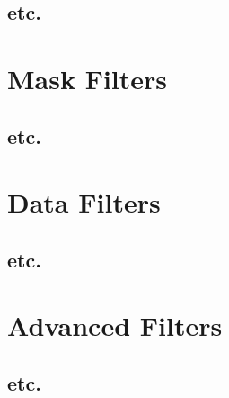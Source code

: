 \documentclass[fleqn,11pt,openany]{book}
\begin{document}
\subsection{etc.}

\section{Mask Filters}

\subsection{etc.}

\section{Data Filters}

\subsection{etc.}

\section{Advanced Filters}

\subsection{etc.}
\end{document}
